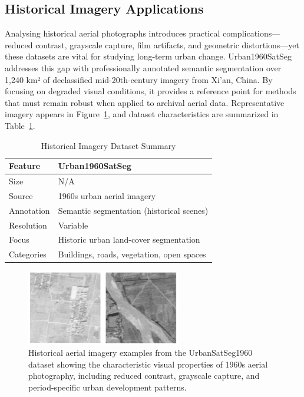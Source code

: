 \subsection{Historical Imagery Applications}

Analysing historical aerial photographs introduces practical complications—reduced contrast, grayscale capture, film artifacts, and geometric distortions—yet these datasets are vital for studying long-term urban change. Urban1960SatSeg~\cite{hao2025urban1960satseg} addresses this gap with professionally annotated semantic segmentation over 1,240 km² of declassified mid-20th-century imagery from Xi'an, China. By focusing on degraded visual conditions, it provides a reference point for methods that must remain robust when applied to archival aerial data. Representative imagery appears in Figure~\ref{fig:historical_examples}, and dataset characteristics are summarized in Table~\ref{tab:historic_comparison}.

\begin{table}[t]
\centering
\caption{Historical Imagery Dataset Summary}
\label{tab:historic_comparison}
\begin{tabular}{@{}ll@{}}
\toprule
\textbf{Feature} & \textbf{Urban1960SatSeg} \\
\midrule
Size & N/A \\
Source & 1960s urban aerial imagery \\
Annotation & Semantic segmentation (historical scenes) \\
Resolution & Variable \\
Focus & Historic urban land-cover segmentation \\
Categories & Buildings, roads, vegetation, open spaces \\
\bottomrule
\end{tabular}
\end{table}

\begin{figure}[t]
\centering
\includegraphics[width=0.6\textwidth]{Images/1960.png}
\caption{Historical aerial imagery examples from the UrbanSatSeg1960 dataset showing the characteristic visual properties of 1960s aerial photography, including reduced contrast, grayscale capture, and period-specific urban development patterns.}
\label{fig:historical_examples}
\end{figure}

